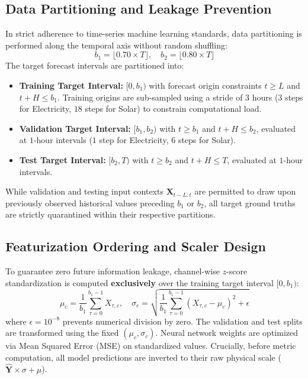 \documentclass[11pt,a4paper]{article}
\begin{document}
\subsection{Data Partitioning and Leakage Prevention}
In strict adherence to time-series machine learning standards, data partitioning is performed along the temporal axis without random shuffling:
\begin{equation}
    b_1 = \lfloor 0.70 \times T \rfloor, \quad b_2 = \lfloor 0.80 \times T \rfloor
\end{equation}
The target forecast intervals are partitioned into:
\begin{itemize}
    \item \textbf{Training Target Interval:} $[0, b_1)$ with forecast origin constraints $t \ge L$ and $t + H \le b_1$. Training origins are sub-sampled using a stride of $3$ hours ($3$ steps for Electricity, $18$ steps for Solar) to constrain computational load.
    \item \textbf{Validation Target Interval:} $[b_1, b_2)$ with $t \ge b_1$ and $t + H \le b_2$, evaluated at $1$-hour intervals ($1$ step for Electricity, $6$ steps for Solar).
    \item \textbf{Test Target Interval:} $[b_2, T)$ with $t \ge b_2$ and $t + H \le T$, evaluated at $1$-hour intervals.
\end{itemize}
While validation and testing input contexts $\mathbf{X}_{t-L:t}$ are permitted to draw upon previously observed historical values preceding $b_1$ or $b_2$, all target ground truths are strictly quarantined within their respective partitions.

\subsection{Featurization Ordering and Scaler Design}
To guarantee zero future information leakage, channel-wise $z$-score standardization is computed \textbf{exclusively} over the training target interval $[0, b_1)$:
\begin{equation}
    \mu_c = \frac{1}{b_1} \sum_{\tau=0}^{b_1-1} X_{\tau, c}, \quad \sigma_c = \sqrt{\frac{1}{b_1} \sum_{\tau=0}^{b_1-1} (X_{\tau, c} - \mu_c)^2 + \epsilon}
\end{equation}
where $\epsilon = 10^{-8}$ prevents numerical division by zero. The validation and test splits are transformed using the fixed $(\mu_c, \sigma_c)$. Neural network weights are optimized via Mean Squared Error (MSE) on standardized values. Crucially, before metric computation, all model predictions are inverted to their raw physical scale ($\hat{\mathbf{Y}} \times \sigma + \mu$).
\end{document}
